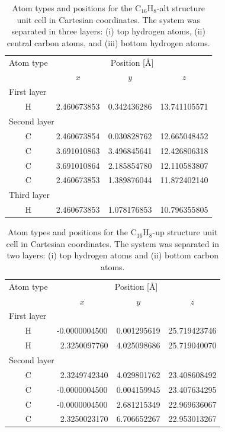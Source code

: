 \documentclass[pss]{wiley2sp} %
\begin{document}
\begin{table}[t]
  \begin{tabular}{cccc}
  \hline
  Atom type &  \multicolumn{3}{c}{Position [\AA] } \\
  \cline{2-4}
  & $x$ & $y$ & $z$ \\
  \hline
  \multicolumn{2}{l}{First layer}\\
H & 2.460673853 & 0.342436286 & 13.741105571 \\
  \multicolumn{2}{l}{Second layer}\\
C & 2.460673854 & 0.030828762 & 12.665048452 \\
C & 3.691010863 & 3.496845641 & 12.426806318 \\
C & 3.691010864 & 2.185854780 & 12.110583807 \\
C & 2.460673853 & 1.389876044 & 11.872402140 \\
  \multicolumn{2}{l}{Third layer}\\
H & 2.460673853 & 1.078176853 & 10.796355805 \\
  \hline
  \end{tabular}
  \caption[]{%
  Atom types and positions for the C$_{16}$H$_{8}$-alt structure unit cell in Cartesian coordinates. The system was separated in three layers: (i) top hydrogen atoms, (ii) central carbon atoms, and (iii) bottom hydrogen atoms. }
  \label{tab:altstrc}
\end{table}
\begin{table}[t]
  \begin{tabular}{cccc}
  \hline
  Atom type &  \multicolumn{3}{c}{Position [\AA]} \\
  \cline{2-4}
  & $x$ & $y$ & $z$ \\
  \hline
  \multicolumn{2}{l}{First layer}\\
H &  -0.0000004500 & 0.001295619 & 25.719423746 \\
H & \ 2.3250097760 & 4.025098686 & 25.719040070 \\
  \multicolumn{2}{l}{Second layer}\\
C & \ 2.3249742340 & 4.029801762 & 23.408608492 \\
C &  -0.0000004500 & 0.004159945 & 23.407634295 \\
C &  -0.0000004500 & 2.681215349 & 22.969636067 \\
C & \ 2.3250023170 & 6.706652267 & 22.953013267 \\
  \hline
  \end{tabular}
  \caption[]{%
  Atom types and positions for the C$_{16}$H$_{8}$-up structure unit cell in Cartesian coordinates. The system was separated in two layers: (i) top hydrogen atoms and (ii) bottom carbon atoms.}
  \label{tab:upstrc}
\end{table}
\end{document}
